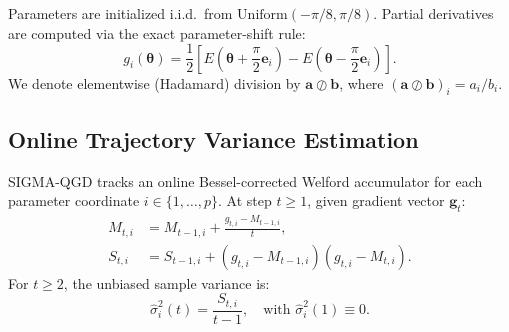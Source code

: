 \documentclass[sn-mathphys,Numbered]{sn-jnl}
\theoremstyle{thmstyleone}
\theoremstyle{thmstyletwo}
\theoremstyle{thmstylethree}
\begin{document}
Parameters are initialized i.i.d.\ from $\text{Uniform}(-\pi/8, \pi/8)$. Partial derivatives are computed via the exact parameter-shift rule:
\begin{equation}
g_i(\boldsymbol{\theta}) = \frac{1}{2} \left[ E\left(\boldsymbol{\theta} + \frac{\pi}{2}\mathbf{e}_i\right) - E\left(\boldsymbol{\theta} - \frac{\pi}{2}\mathbf{e}_i\right) \right].
\label{eq:param_shift}
\end{equation}
We denote elementwise (Hadamard) division by $\mathbf{a} \oslash \mathbf{b}$, where $(\mathbf{a} \oslash \mathbf{b})_i = a_i / b_i$.

\subsection{Online Trajectory Variance Estimation}
SIGMA-QGD tracks an online Bessel-corrected Welford accumulator \cite{welford1962note} for each parameter coordinate $i \in \{1, \dots, p\}$. At step $t \ge 1$, given gradient vector $\mathbf{g}_t$:
\begin{align}
M_{t,i} &= M_{t-1,i} + \frac{g_{t,i} - M_{t-1,i}}{t}, \label{eq:welford_m} \\
S_{t,i} &= S_{t-1,i} + (g_{t,i} - M_{t-1,i})(g_{t,i} - M_{t,i}). \label{eq:welford_s}
\end{align}
For $t \ge 2$, the unbiased sample variance is:
\begin{equation}
\hat{\sigma}_i^2(t) = \frac{S_{t,i}}{t - 1}, \quad \text{with } \hat{\sigma}_i^2(1) \equiv 0.
\label{eq:welford_var}
\end{equation}
\end{document}
